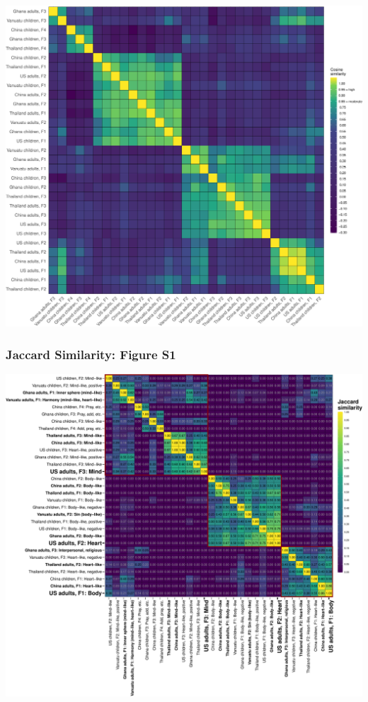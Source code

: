 \documentclass[
  man]{apa6}
\begin{document}
\includegraphics{Script_Re_Weisman_2021_Group1_2024_files/figure-latex/cong all pairs plot b-1.pdf}

\hypertarget{jaccard-similarity-figure-s1}{%
\subsubsection{Jaccard Similarity: Figure S1}\label{jaccard-similarity-figure-s1}}

\includegraphics{Script_Re_Weisman_2021_Group1_2024_files/figure-latex/jaccard all pairs plot-1.pdf}
\end{document}

